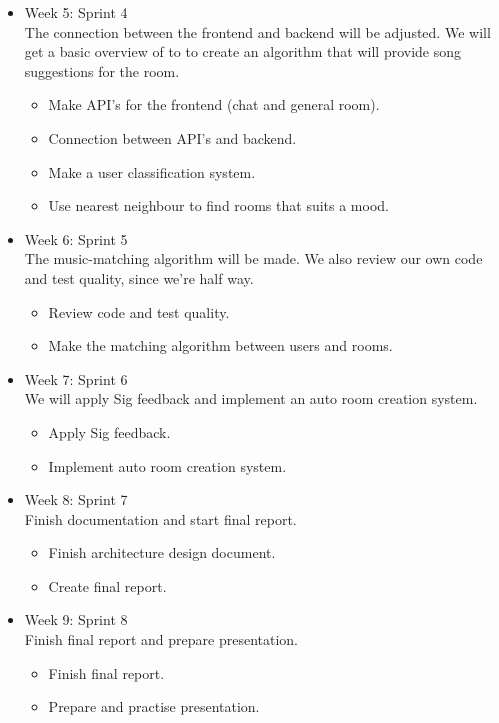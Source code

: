 \begin{itemize}
\item Week 5: Sprint 4\\
The connection between the frontend and backend will be adjusted. We will get a basic overview of to to create an algorithm that will provide song suggestions for the room.

\begin{itemize}
\item Make API's for the frontend (chat and general room).
\item Connection between API's and backend.
\item Make a user classification system.
\item Use nearest neighbour to find rooms that suits a mood.
\end{itemize}

\item Week 6: Sprint 5\\
The music-matching algorithm will be made. We also review our own code and test quality, since we're half way.

\begin{itemize}
\item Review code and test quality.
\item Make the matching algorithm between users and rooms.
\end{itemize}

\item Week 7: Sprint 6\\
We will apply Sig feedback and implement an auto room creation system.

\begin{itemize}
\item Apply Sig feedback.
\item Implement auto room creation system.
\end{itemize}

\item Week 8: Sprint 7\\
Finish documentation and start final report.

\begin{itemize}
\item Finish architecture design document.
\item Create final report.
\end{itemize}


\item Week 9: Sprint 8\\
Finish final report and prepare presentation.

\begin{itemize}
\item Finish final report.
\item Prepare and practise presentation.
\end{itemize}


\end{itemize}

